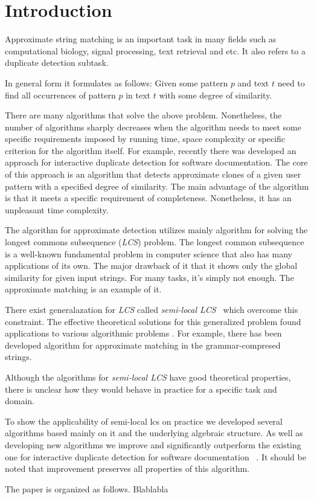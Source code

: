 \section{Introduction}
Approximate string matching is an important task in many fields such as computational biology, signal processing, text retrieval and etc.
It also refers to a duplicate detection subtask.

In general form it formulates as follows: Given some pattern $p$ and text $t$ need to find all occurrences of pattern $p$ in text $t$ with some degree of similarity.

There are many algorithms that solve the above problem.
Nonetheless, the number of algorithms sharply decreases  when the algorithm needs to meet some specific requirements imposed by running time, space complexity or specific criterion for the algorithm itself.
For example, recently there was developed an approach for interactive duplicate detection for software documentation\red{\cite{}}.
The core of this approach is an algorithm that detects approximate clones of a given user pattern with a specified degree of similarity. 
The main advantage of the algorithm is that it meets a specific requirement of completeness.
Nonetheless, it has an unpleasant time complexity.    


The algorithm for approximate detection utilizes mainly algorithm for solving the longest commons subsequence (\emph{LCS}) problem.
The longest common subsequence is a well-known fundamental problem in computer science that also has many applications of its own.
The major drawback of it that it shows only the global similarity for given input strings.
For many tasks, it's simply not enough.
The approximate matching is an example of it.

There exist generalazation for \emph{LCS} called \emph{semi-local LCS}~\cite{} which overcome this constraint. 
The effective theoretical solutions for this generalized problem found applications to various algorithmic problems .
For example, there has been developed algorithm for approximate matching in the grammar-compresed strings\cite{}.

Although the algorithms for \emph{semi-local LCS} have good theoretical properties, there is unclear how they would behave in practice for a specific task and domain.

To show the applicability of semi-local lcs on practice we developed several algorithms based mainly on it and the underlying algebraic structure.
As well as developing new algorithms we improve and significantly outperform the existing one for interactive duplicate detection for software documentation ~\cite{}.
It should be noted that improvement preserves all properties of this algorithm.



The paper is organized as follows.
Blablabla

